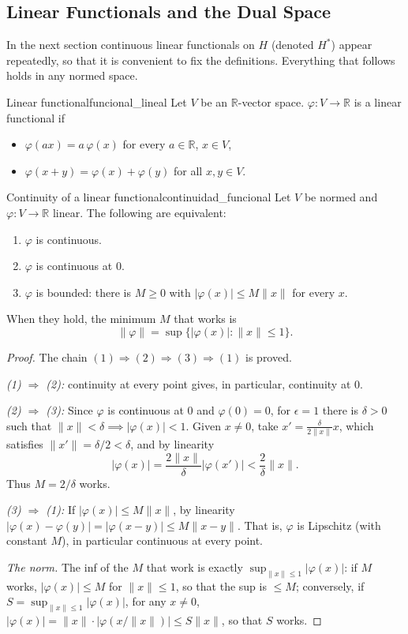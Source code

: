 \documentclass[11pt, a4paper]{article}
\begin{document}
\subsection{Linear Functionals and the Dual Space}

In the next section continuous linear functionals on $H$ (denoted $H^*$) appear repeatedly,
so that it is convenient to fix the definitions. Everything that follows holds in any
normed space.

\begin{definicion}{Linear functional}{funcional_lineal}
Let $V$ be an $\mathbb{R}$-vector space. $\varphi: V \to \mathbb{R}$ is a linear functional if
\begin{itemize}
    \item $\varphi(ax) = a\,\varphi(x)$ for every $a \in \mathbb{R}$, $x \in V$,
    \item $\varphi(x+y) = \varphi(x) + \varphi(y)$ for all $x, y \in V$.
\end{itemize}
\end{definicion}

\begin{proposicion}{Continuity of a linear functional}{continuidad_funcional}
Let $V$ be normed and $\varphi: V \to \mathbb{R}$ linear. The following are equivalent:
\begin{enumerate}
    \item $\varphi$ is continuous.
    \item $\varphi$ is continuous at $0$.
    \item $\varphi$ is bounded: there is $M \ge 0$ with $|\varphi(x)| \le M \|x\|$ for every $x$.
\end{enumerate}
When they hold, the minimum $M$ that works is
$$ \|\varphi\| = \sup \{ |\varphi(x)| : \|x\| \le 1 \}. $$
\end{proposicion}

\begin{proof}
The chain $(1) \Rightarrow (2) \Rightarrow (3) \Rightarrow (1)$ is proved.

\textit{(1) $\Rightarrow$ (2):} continuity at every point gives, in particular, continuity at
$0$.

\textit{(2) $\Rightarrow$ (3):} Since $\varphi$ is continuous at $0$ and $\varphi(0) = 0$, for
$\epsilon = 1$ there is $\delta > 0$ such that $\|x\| < \delta \implies |\varphi(x)| < 1$. Given
$x \ne 0$, take $x' = \tfrac{\delta}{2 \|x\|} x$, which satisfies $\|x'\| = \delta/2 < \delta$, and by
linearity
$$ |\varphi(x)| = \frac{2\|x\|}{\delta} |\varphi(x')| < \frac{2}{\delta} \|x\|. $$
Thus $M = 2/\delta$ works.

\textit{(3) $\Rightarrow$ (1):} If $|\varphi(x)| \le M \|x\|$, by linearity
$|\varphi(x) - \varphi(y)| = |\varphi(x - y)| \le M \|x - y\|$. That is, $\varphi$ is Lipschitz
(with constant $M$), in particular continuous at every point.

\textit{The norm.} The inf of the $M$ that work is exactly
$\sup_{\|x\| \le 1} |\varphi(x)|$: if $M$ works, $|\varphi(x)| \le M$ for $\|x\| \le 1$, so that
the sup is $\le M$; conversely, if $S = \sup_{\|x\|\le 1} |\varphi(x)|$, for any
$x \ne 0$, $|\varphi(x)| = \|x\| \cdot |\varphi(x/\|x\|)| \le S \|x\|$, so that $S$ works.
\end{proof}
\end{document}
